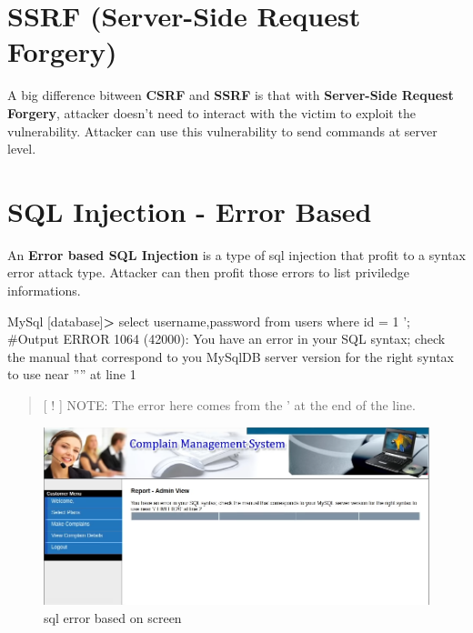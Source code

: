 \documentclass{assets/ipesethesis}
\newenvironment{Shaded}{\begin{snugshade}}{\end{snugshade}}
\newcommand{\ExtensionTok}[1]{#1}
\newcommand{\NormalTok}[1]{#1}
\newcommand{\OperatorTok}[1]{\textcolor[rgb]{0.81,0.36,0.00}{\textbf{#1}}}
\newcommand{\StringTok}[1]{\textcolor[rgb]{0.31,0.60,0.02}{#1}}
\begin{document}
\hypertarget{ssrf-server-side-request-forgery}{%
\section*{SSRF (Server-Side Request Forgery)}\label{ssrf-server-side-request-forgery}}

A big difference bitween \textbf{CSRF} and \textbf{SSRF} is that with \textbf{Server-Side Request Forgery}, attacker doesn't need to interact with the victim to exploit the
vulnerability. Attacker can use this vulnerability to send commands at server level.

\hypertarget{sql-injection---error-based}{%
\section*{SQL Injection - Error Based}\label{sql-injection---error-based}}

An \textbf{Error based SQL Injection} is a type of sql injection that profit to a syntax error attack type. Attacker can then profit those errors to list priviledge
informations.

\begin{Shaded}
\begin{Highlighting}[]
\ExtensionTok{MySql}\NormalTok{ [database]}\OperatorTok{>}\NormalTok{ select username,password from users where id = 1 }\StringTok{';}
\StringTok{#Output}
\StringTok{ERROR 1064 (42000): You have an error in your SQL syntax; check the manual that correspond to you MySqlDB server version for the right syntax to use near '''' at line 1 }
\end{Highlighting}
\end{Shaded}

\begin{quote}
{[} ! {]} NOTE: The error here comes from the ' at the end of the line.
\end{quote}

\begin{figure}
\includegraphics[width=0.9\linewidth]{images/sql-error-based} \caption{sql error based on screen}\label{fig:unnamed-chunk-7}
\end{figure}
\end{document}
